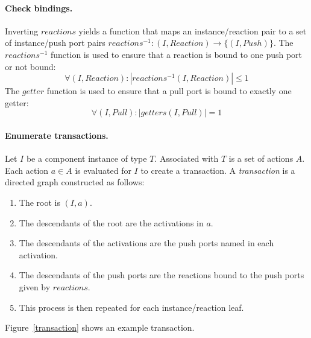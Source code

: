 \paragraph{Check bindings.}
Inverting $reactions$ yields a function that maps an instance/reaction pair to a set of instance/push port pairs $reactions^{-1}: (I,Reaction) \to \{(I,Push)\}$.
The $reactions^{-1}$ function is used to ensure that a reaction is bound to one push port or not bound:
\begin{displaymath}
\forall (I,Reaction) : |reactions^{-1} (I,Reaction)| \leq 1
\end{displaymath}
The $getter$ function is used to ensure that a pull port is bound to exactly one getter:
\begin{displaymath}
\forall (I,Pull) : |getters (I,Pull)| = 1
\end{displaymath}

\paragraph{Enumerate transactions.}
Let $I$ be a component instance of type $T$.
Associated with $T$ is a set of actions $A$.
Each action $a \in A$ is evaluated for $I$ to create a transaction.
A \emph{transaction} is a directed graph constructed as follows:
\begin{enumerate}
\item The root is $(I,a)$.
\item The descendants of the root are the activations in $a$.
\item The descendants of the activations are the push ports named in each activation.
\item The descendants of the push ports are the reactions bound to the push ports given by $reactions$.
\item This process is then repeated for each instance/reaction leaf.
\end{enumerate}
Figure~\ref{transaction} shows an example transaction.

